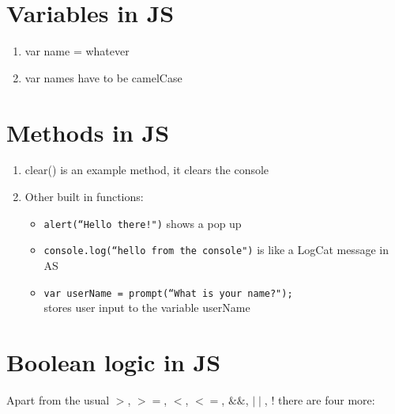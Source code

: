 \documentclass[11pt, a4paper]{article}   	%
\begin{document}
\section{Variables in JS}
\begin{enumerate}
	\item var name = whatever 
	\item var names have to be camelCase
\end{enumerate}


\section{Methods in JS}
\begin{enumerate}
	\item clear() is an example method, it clears the console
	\item Other built in functions: 
	\begin{itemize}
		\item \texttt{alert(``Hello there!")} shows a pop up 
		\item \texttt{console.log(``hello from the console")} is like a LogCat message in AS
		\item \texttt{var userName = prompt(``What is your name?");} \\ stores user input to the variable userName
	\end{itemize}
\end{enumerate}

\section{Boolean logic in JS}

Apart from the usual $>$, $>=$, $<$, $<=$, $\&\&$, $\mid\mid$, $!$ there are four more:
\end{document}
